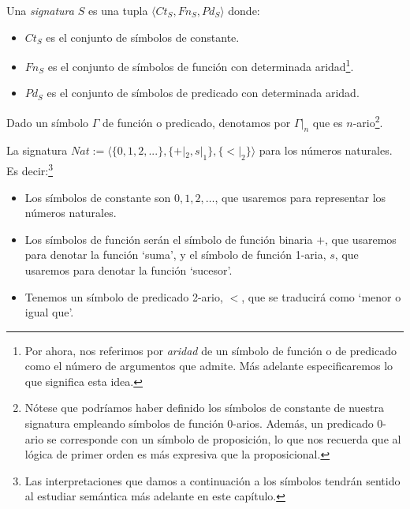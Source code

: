 \begin{definition}\label{sig}
Una \textit{signatura} $S$ es una tupla $\langle Ct_{S}, Fn_{S}, Pd_{S}\rangle$ donde:
\begin{itemize}
    \item $Ct_{S}$ es el conjunto de símbolos de constante.
    \item $Fn_{S}$ es el conjunto de símbolos de función con determinada aridad\footnote{Por ahora, nos referimos por \textit{aridad} de un símbolo de función o de predicado como el número de argumentos que admite. Más adelante especificaremos lo que significa esta idea.}.
    \item $Pd_{S}$ es el conjunto de símbolos de predicado con determinada aridad.
\end{itemize} 
Dado un símbolo $\Gamma$ de función o predicado, denotamos por $\Gamma|_{n}$ que es $n$-ario\footnote{Nótese que podríamos haber definido los símbolos de constante de nuestra signatura empleando símbolos de función 0-arios. Además, un predicado 0-ario se corresponde con un símbolo de proposición, lo que nos recuerda que al lógica de primer orden es más expresiva que la proposicional.}.
\end{definition}


\begin{example}
La signatura $Nat := \langle \{0, 1, 2, ... \}, \{+|_2, s|_1\}, \{<|_2\}\rangle$ para los números naturales. Es decir:\footnote{Las interpretaciones que damos a continuación a los símbolos tendrán sentido al estudiar semántica más adelante en este capítulo.}
\begin{itemize}
    \item Los símbolos de constante son $0,1,2,\dots$, que usaremos para representar los números naturales.
    \item Los símbolos de función serán el símbolo de función binaria $+$, que usaremos para denotar la función `suma', y el símbolo de función 1-aria, $s$, que usaremos para denotar la función `sucesor'.
    \item Tenemos un símbolo de predicado 2-ario, $<$, que se traducirá como `menor o igual que'.
\end{itemize}
\end{example}

